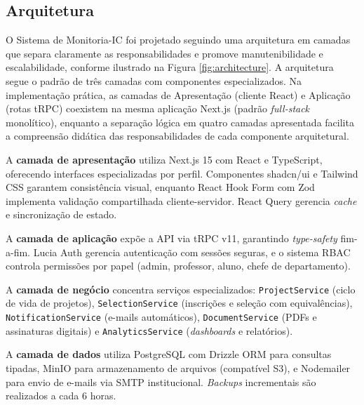 \documentclass[portuguese]{sbc2025}%
\begin{document}
\subsection{Arquitetura}

O Sistema de Monitoria-IC foi projetado seguindo uma arquitetura em camadas que separa claramente as responsabilidades e promove manutenibilidade e escalabilidade, conforme ilustrado na Figura \ref{fig:architecture}. A arquitetura segue o padrão de três camadas com componentes especializados. Na implementação prática, as camadas de Apresentação (cliente React) e Aplicação (rotas tRPC) coexistem na mesma aplicação Next.js (padrão \textit{full-stack} monolítico), enquanto a separação lógica em quatro camadas apresentada facilita a compreensão didática das responsabilidades de cada componente arquitetural.

A \textbf{camada de apresentação} utiliza Next.js 15 com React e TypeScript, oferecendo interfaces especializadas por perfil. Componentes shadcn/ui e Tailwind CSS garantem consistência visual, enquanto React Hook Form com Zod implementa validação compartilhada cliente-servidor. React Query gerencia \textit{cache} e sincronização de estado.

A \textbf{camada de aplicação} expõe a API via tRPC v11, garantindo \textit{type-safety} fim-a-fim. Lucia Auth gerencia autenticação com sessões seguras, e o sistema RBAC controla permissões por papel (admin, professor, aluno, chefe de departamento).

A \textbf{camada de negócio} concentra serviços especializados: \texttt{ProjectService} (ciclo de vida de projetos), \texttt{SelectionService} (inscrições e seleção com equivalências), \texttt{NotificationService} (e-mails automáticos), \texttt{DocumentService} (PDFs e assinaturas digitais) e \texttt{AnalyticsService} (\textit{dashboards} e relatórios).

A \textbf{camada de dados} utiliza PostgreSQL com Drizzle ORM para consultas tipadas, MinIO para armazenamento de arquivos (compatível S3), e Nodemailer para envio de e-mails via SMTP institucional. \textit{Backups} incrementais são realizados a cada 6 horas.
\end{document}
